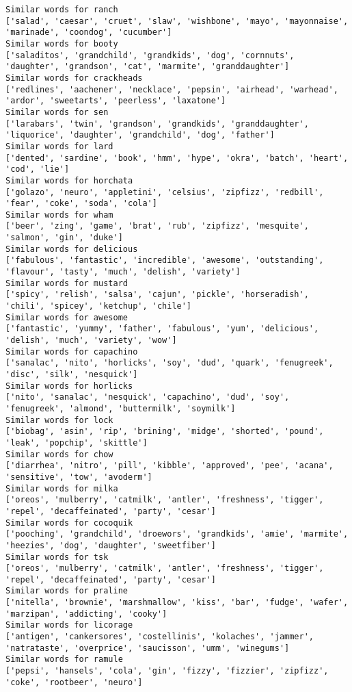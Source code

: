\documentclass[11pt]{article}
\begin{document}
\begin{Verbatim}[commandchars=\\\{\}]
Similar words for ranch
['salad', 'caesar', 'cruet', 'slaw', 'wishbone', 'mayo', 'mayonnaise', 'marinade', 'coondog', 'cucumber']
Similar words for booty
['saladitos', 'grandchild', 'grandkids', 'dog', 'cornnuts', 'daughter', 'grandson', 'cat', 'marmite', 'granddaughter']
Similar words for crackheads
['redlines', 'aachener', 'necklace', 'pepsin', 'airhead', 'warhead', 'ardor', 'sweetarts', 'peerless', 'laxatone']
Similar words for sen
['larabars', 'twin', 'grandson', 'grandkids', 'granddaughter', 'liquorice', 'daughter', 'grandchild', 'dog', 'father']
Similar words for lard
['dented', 'sardine', 'book', 'hmm', 'hype', 'okra', 'batch', 'heart', 'cod', 'lie']
Similar words for horchata
['golazo', 'neuro', 'appletini', 'celsius', 'zipfizz', 'redbill', 'fear', 'coke', 'soda', 'cola']
Similar words for wham
['beer', 'zing', 'game', 'brat', 'rub', 'zipfizz', 'mesquite', 'salmon', 'gin', 'duke']
Similar words for delicious
['fabulous', 'fantastic', 'incredible', 'awesome', 'outstanding', 'flavour', 'tasty', 'much', 'delish', 'variety']
Similar words for mustard
['spicy', 'relish', 'salsa', 'cajun', 'pickle', 'horseradish', 'chili', 'spicey', 'ketchup', 'chile']
Similar words for awesome
['fantastic', 'yummy', 'father', 'fabulous', 'yum', 'delicious', 'delish', 'much', 'variety', 'wow']
Similar words for capachino
['sanalac', 'nito', 'horlicks', 'soy', 'dud', 'quark', 'fenugreek', 'disc', 'silk', 'nesquick']
Similar words for horlicks
['nito', 'sanalac', 'nesquick', 'capachino', 'dud', 'soy', 'fenugreek', 'almond', 'buttermilk', 'soymilk']
Similar words for lock
['biobag', 'asin', 'rip', 'brining', 'midge', 'shorted', 'pound', 'leak', 'popchip', 'skittle']
Similar words for chow
['diarrhea', 'nitro', 'pill', 'kibble', 'approved', 'pee', 'acana', 'sensitive', 'tow', 'avoderm']
Similar words for milka
['oreos', 'mulberry', 'catmilk', 'antler', 'freshness', 'tigger', 'repel', 'decaffeinated', 'party', 'cesar']
Similar words for cocoquik
['pooching', 'grandchild', 'droewors', 'grandkids', 'amie', 'marmite', 'heezies', 'dog', 'daughter', 'sweetfiber']
Similar words for tsk
['oreos', 'mulberry', 'catmilk', 'antler', 'freshness', 'tigger', 'repel', 'decaffeinated', 'party', 'cesar']
Similar words for praline
['nitella', 'brownie', 'marshmallow', 'kiss', 'bar', 'fudge', 'wafer', 'marzipan', 'addicting', 'cooky']
Similar words for licorage
['antigen', 'cankersores', 'costellinis', 'kolaches', 'jammer', 'natrataste', 'overprice', 'saucisson', 'umm', 'winegums']
Similar words for ramule
['pepsi', 'hansels', 'cola', 'gin', 'fizzy', 'fizzier', 'zipfizz', 'coke', 'rootbeer', 'neuro']

\end{Verbatim}
\end{document}
